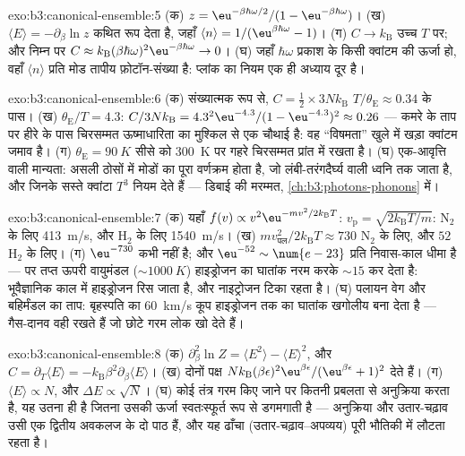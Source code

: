 \begin{solution}{exo:b3:canonical-ensemble:5}
(क) $z = \eu^{-\beta\hbar\omega/2}/(1 - \eu^{-\beta\hbar\omega})$।
(ख) $\langle E\rangle = -\partial_\beta\ln z$ कथित रूप देता है,
जहाँ $\langle n\rangle = 1/(\eu^{\beta\hbar\omega} - 1)$। (ग)
$C \to k_{\text{B}}$ उच्च $T$ पर; और निम्न पर $C \approx k_{\text{B}}(\beta
\hbar\omega)^2\eu^{-\beta\hbar\omega} \to 0$। (घ) जहाँ
$\hbar\omega$ प्रकाश के किसी क्वांटम की ऊर्जा हो, वहाँ $\langle n\rangle$
प्रति मोड तापीय फ़ोटॉन-संख्या है: प्लांक का नियम एक ही अध्याय दूर है।
\end{solution}

\begin{solution}{exo:b3:canonical-ensemble:6}
(क) संख्यात्मक रूप से, $C = \tfrac12 \times 3Nk_{\text{B}}$
$T/\theta_{\text{E}} \approx 0.34$ के पास। (ख) $\theta_{\text{E}}/T =
4.3$: $C/3Nk_{\text{B}} = 4.3^2\eu^{-4.3}/(1 - \eu^{-4.3})^2
\approx 0.26$ --- कमरे के ताप पर हीरे के पास चिरसम्मत ऊष्माधारिता
का मुश्किल से एक चौथाई है: वह ``विषमता'' खुले में खड़ा क्वांटम
जमाव है। (ग) $\theta_{\text{E}} = \qty{90}{K}$
सीसे को \qty{300}{K} पर गहरे चिरसम्मत प्रांत में रखता है। (घ)
एक-आवृत्ति वाली मान्यता: असली ठोसों में मोडों का पूरा वर्णक्रम होता
है, जो लंबी-तरंगदैर्घ्य वाली ध्वनि तक जाता है, और जिनके सस्ते
क्वांटा $T^3$ नियम देते हैं --- डिबाई की मरम्मत,
\cref{ch:b3:photons-phonons} में।
\end{solution}

\begin{solution}{exo:b3:canonical-ensemble:7}
(क) यहाँ $f(v) \propto v^2\eu^{-mv^2/2k_{\text{B}}T}$: $v_{\text{p}} =
\sqrt{2k_{\text{B}}T/m}$: N$_2$ के लिए \qty{413}{m/s},
और H$_2$ के लिए \qty{1540}{m/s}। (ख) $mv_{\text{पल}}^2/2k_{\text{B}}T
\approx 730$ N$_2$ के लिए, और $52$ H$_2$ के लिए। (ग) $\eu^{-730}$
कभी नहीं है; और $\eu^{-52} \sim \num{e-23}$ प्रति निवास-काल धीमा है
--- पर तप्त ऊपरी वायुमंडल ($\sim\qty{1000}{K}$) हाइड्रोजन का
घातांक नरम करके $\sim15$ कर देता है: भूवैज्ञानिक काल में हाइड्रोजन
रिस जाता है, और नाइट्रोजन टिका रहता है। (घ) पलायन वेग और बहिर्मंडल
का ताप: बृहस्पति का \qty{60}{km/s} कूप हाइड्रोजन तक का
घातांक खगोलीय बना देता है --- गैस-दानव वही रखते हैं जो छोटे गरम लोक
खो देते हैं।
\end{solution}

\begin{solution}{exo:b3:canonical-ensemble:8}
(क) $\partial_\beta^2\ln Z = \langle E^2\rangle - \langle
E\rangle^2$, और $C = \partial_T\langle E\rangle =
-k_{\text{B}}\beta^2\partial_\beta\langle E\rangle$। (ख) दोनों
पक्ष $Nk_{\text{B}}(\beta\epsilon)^2\eu^{\beta\epsilon}/(
\eu^{\beta\epsilon} + 1)^2$ देते हैं। (ग) $\langle E\rangle \propto N$,
और $\Delta E \propto \sqrt N$। (घ) कोई तंत्र गरम किए जाने पर कितनी
प्रबलता से अनुक्रिया करता है, यह उतना ही है जितना उसकी ऊर्जा
स्वतःस्फूर्त रूप से डगमगाती है --- अनुक्रिया और उतार-चढ़ाव उसी एक
द्वितीय अवकलज के दो पाठ हैं, और यह ढाँचा
(उतार-चढ़ाव--अपव्यय) पूरी भौतिकी में लौटता रहता है।
\end{solution}

